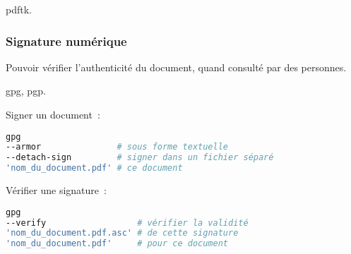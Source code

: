 \gls{pdftk}.

\subsubsection{Signature numérique}

Pouvoir vérifier l’authenticité du document, quand consulté par des personnes.

\gls{gpg}, \gls{pgp}.

Signer un document :
\begin{lstlisting}[language=sh]
gpg
--armor               # sous forme textuelle
--detach-sign         # signer dans un fichier séparé
'nom_du_document.pdf' # ce document
\end{lstlisting}

Vérifier une signature :
\begin{lstlisting}[language=sh]
gpg
--verify                  # vérifier la validité
'nom_du_document.pdf.asc' # de cette signature
'nom_du_document.pdf'     # pour ce document
\end{lstlisting}

\pagebreak
